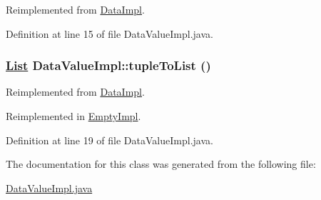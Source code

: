 Reimplemented from \hyperlink{classDataImpl_a3}{Data\-Impl}.

Definition at line 15 of file Data\-Value\-Impl.java.\hypertarget{classDataValueImpl_a2}{
\subsubsection[tupleToList]{\setlength{\rightskip}{0pt plus 5cm}\hyperlink{interfaceList}{List} Data\-Value\-Impl::tuple\-To\-List ()}}
\label{classDataValueImpl_a2}




Reimplemented from \hyperlink{classDataImpl_a1}{Data\-Impl}.

Reimplemented in \hyperlink{classEmptyImpl_a3}{Empty\-Impl}.

Definition at line 19 of file Data\-Value\-Impl.java.

The documentation for this class was generated from the following file:\begin{CompactItemize}
\item 
\hyperlink{DataValueImpl_8java-source}{Data\-Value\-Impl.java}\end{CompactItemize}
